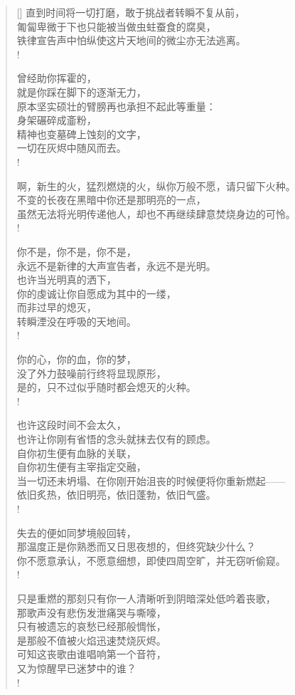 \documentclass[UTF8, 12pt, a4paper]{ctexrep} %
\begin{document}
\begin{verse}[\versewidth]
直到时间将一切打磨，敢于挑战者转瞬不复从前，\\
匍匐卑微于下也只能被当做虫蛀蚕食的腐臭，\\
铁律宣告声中怕纵使这片天地间的微尘亦无法逃离。\\!

曾经助你挥霍的，\\
就是你踩在脚下的逐渐无力，\\
原本坚实硕壮的臂膀再也承担不起此等重量：\\
身架碾碎成齑粉，\\
精神也变墓碑上蚀刻的文字，\\
一切在灰烬中随风而去。\\!

啊，新生的火，猛烈燃烧的火，纵你万般不愿，请只留下火种。\\
不变的长夜在黑暗中你还是那明亮的一点，\\
虽然无法将光明传递他人，却也不再继续肆意焚烧身边的可怜。\\!

你不是，你不是，你不是，\\
永远不是新律的大声宣告者，永远不是光明。\\
也许当光明真的洒下，\\
你的虔诚让你自愿成为其中的一缕，\\
而非过早的熄灭，\\
转瞬湮没在呼吸的天地间。\\!

你的心，你的血，你的梦，\\
没了外力鼓噪前行终将显现原形，\\
是的，只不过似乎随时都会熄灭的火种。\\!

也许这段时间不会太久，\\
也许让你刚有省悟的念头就抹去仅有的顾虑。\\
自你初生便有血脉的关联，\\
自你初生便有主宰指定交融，\\
当一切还未坍塌、在你刚开始沮丧的时候便将你重新燃起——\\
依旧炙热，依旧明亮，依旧蓬勃，依旧气盛。\\!

失去的便如同梦境般回转，\\
那温度正是你熟悉而又日思夜想的，但终究缺少什么？\\
你不愿意承认，不愿意细想，即使四周空旷，并无窃听偷窥。\\!

只是重燃的那刻只有你一人清晰听到阴暗深处低吟着丧歌，\\
那歌声没有悲伤发泄痛哭与嘶嚎，\\
只有被遗忘的哀愁已经那般惆怅，\\
是那般不值被火焰迅速焚烧灰烬。\\
可知这丧歌由谁唱响第一个音符，\\
又为惊醒早已迷梦中的谁？\\!


\end{verse}
\end{document}
